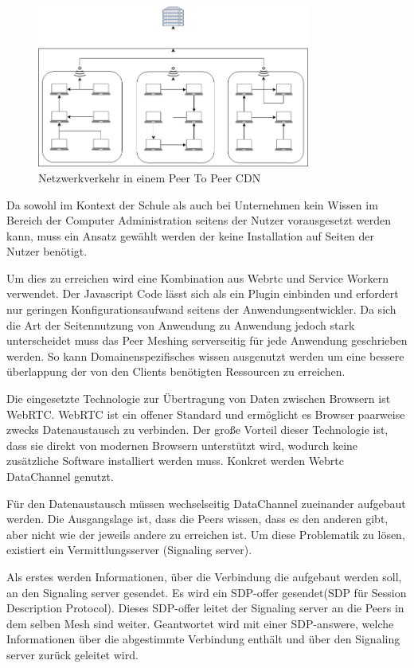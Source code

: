 \begin{figure}[!h]
	\centering
	\includegraphics[width=0.8\textwidth]{figures/network_p2p}
	\caption[A Figure Short-Title]{Netzwerkverkehr in einem Peer To Peer CDN}
	\label{fig:mesh}
\end{figure}

Da sowohl im Kontext der Schule als auch bei Unternehmen kein Wissen im Bereich der Computer Administration seitens der Nutzer vorausgesetzt werden kann, muss ein Ansatz gewählt werden der keine Installation auf Seiten der Nutzer benötigt.

Um dies zu erreichen wird eine Kombination aus Webrtc und Service Workern verwendet. Der Javascript Code lässt sich als ein Plugin einbinden und erfordert nur geringen Konfigurationsaufwand seitens der Anwendungsentwickler. Da sich die Art der Seitennutzung von Anwendung zu Anwendung jedoch stark unterscheidet muss das Peer Meshing serverseitig für jede Anwendung geschrieben werden. So kann Domainenspezifisches wissen ausgenutzt werden um eine bessere überlappung der von den Clients benötigten Ressourcen zu erreichen. 

Die eingesetzte Technologie zur Übertragung von Daten zwischen Browsern ist WebRTC. WebRTC ist ein offener Standard und ermöglicht es Browser paarweise zwecks Datenaustausch zu verbinden. Der große Vorteil dieser Technologie ist, dass sie direkt von modernen Browsern unterstützt wird, wodurch keine zusätzliche Software installiert werden muss. Konkret werden Webrtc DataChannel genutzt.

Für den Datenaustausch müssen wechselseitig DataChannel zueinander aufgebaut werden. Die Ausgangslage ist, dass die Peers wissen, dass es den anderen gibt, aber nicht wie der jeweils andere zu erreichen ist. Um diese Problematik zu lösen, existiert ein Vermittlungsserver (Signaling server).

Als erstes werden Informationen, über die Verbindung die aufgebaut werden soll, an den Signaling server gesendet. Es wird ein SDP-offer gesendet(SDP für Session Description Protocol). Dieses SDP-offer leitet der Signaling server an die Peers in dem selben Mesh sind weiter. Geantwortet wird mit einer SDP-answere, welche Informationen über die abgestimmte Verbindung enthält und über den Signaling server zurück geleitet wird.

